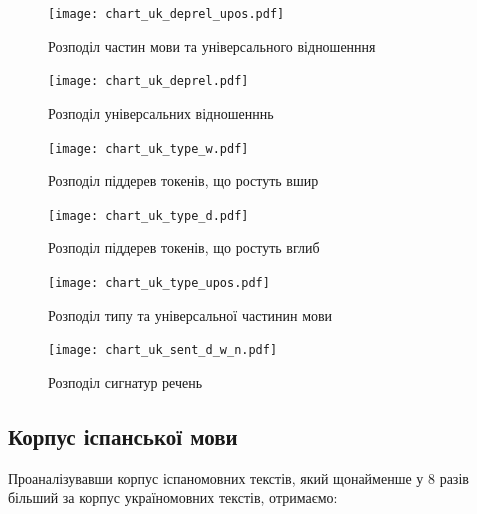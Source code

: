 \begin{figure}[ht]
  \begin{center}
    \texttt{[image: chart\_uk\_deprel\_upos.pdf]}
  \end{center}
  \caption{Розподіл частин мови та універсального відношенння}
  \label{img:uk_deprel_upos}
\end{figure}

\newpage

\begin{multicols}{2}
\begin{figure}[H]
  \begin{center}
    \texttt{[image: chart\_uk\_deprel.pdf]}
  \end{center}
  \caption{Розподіл універсальних відношенннь}
  \label{img:uk0}
\end{figure}

\begin{figure}[H]
  \begin{center}
    \texttt{[image: chart\_uk\_type\_w.pdf]}
  \end{center}
  \caption{Розподіл піддерев токенів, що ростуть вшир}
  \label{img:uk3}
\end{figure}

\begin{figure}[H]
  \begin{center}
    \texttt{[image: chart\_uk\_type\_d.pdf]}
  \end{center}
  \caption{Розподіл піддерев токенів, що ростуть вглиб}
  \label{img:uk4}
\end{figure}

\begin{figure}[H]
  \begin{center}
    \texttt{[image: chart\_uk\_type\_upos.pdf]}
  \end{center}
  \caption{Розподіл типу та універсальної частинин мови}
  \label{img:uk5}
\end{figure}

\begin{figure}[H]
  \begin{center}
    \texttt{[image: chart\_uk\_sent\_d\_w\_n.pdf]}
  \end{center}
  \caption{Розподіл сигнатур речень}
  \label{img:uk6}
\end{figure}
\end{multicols}

\newpage

\subsection{Корпус іспанської мови}
Проаналізувавши корпус іспаномовних текстів, який щонайменше у 8 разів
більший за корпус україномовних текстів, отримаємо:

